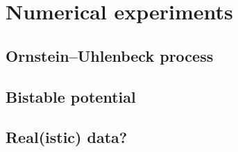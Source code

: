 \documentclass[10pt]{article}
\begin{document}
\section{Numerical experiments}

\subsection{Ornstein--Uhlenbeck process}

\subsection{Bistable potential}

\subsection{Real(istic) data?}



\end{document}

